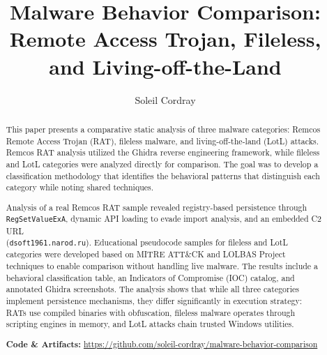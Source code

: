 \documentclass[sigconf]{acmart}
\begin{document}
\title{Malware Behavior Comparison: \\
Remote Access Trojan, Fileless, and Living-off-the-Land}
\author{Soleil Cordray}


\begin{abstract} 

\vspace{0.5em} \qquad This paper presents a comparative static analysis of three malware categories: Remcos Remote Access Trojan (RAT), fileless malware, and living-off-the-land (LotL) attacks. Remcos RAT analysis utilized the Ghidra reverse engineering framework, while fileless and LotL categories were analyzed directly for comparison. The goal was to develop a classification methodology that identifies the behavioral patterns that distinguish each category while noting shared techniques.

\qquad Analysis of a real Remcos RAT sample revealed registry-based persistence through \texttt{RegSetValueExA}, dynamic API loading to evade import analysis, and an embedded C2 URL \\ (\texttt{dsoft1961.narod.ru}). Educational pseudocode samples for fileless and LotL categories were developed based on MITRE ATT\&CK and LOLBAS Project techniques to enable comparison without handling live malware. The results include a behavioral classification table, an Indicators of Compromise (IOC) catalog, and annotated Ghidra screenshots. The analysis shows that while all three categories implement persistence mechanisms, they differ significantly in execution strategy: RATs use compiled binaries with obfuscation, fileless malware operates through scripting engines in memory, and LotL attacks chain trusted Windows utilities.

\vspace{0.5em}
\noindent\textbf{Code \& Artifacts: } \url{https://github.com/soleil-cordray/malware-behavior-comparison}
\end{abstract}

\maketitle
\renewcommand{\shortauthors}{Soleil Cordray}
\renewcommand{\shorttitle}{Malware Behavior Comparison: Remote Access Trojan, Fileless, and Living-off-the-Land}
\end{document}
